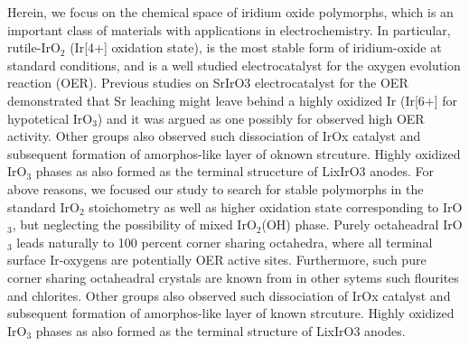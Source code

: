 




Herein, we focus on the chemical space of iridium oxide polymorphs,
which is an important class of materials with applications in electrochemistry. In particular, rutile-IrO$_2$ (Ir[4+] oxidation state), is the most stable form of iridium-oxide at standard conditions, and is a well studied electrocatalyst for the oxygen evolution reaction (OER).\cite{like 5 papers here pls}
Previous studies on SrIrO3 electrocatalyst for the OER demonstrated that Sr leaching might leave behind a highly oxidized Ir (Ir[6+] for hypotetical IrO$_3$) and it was argued as one possibly for observed high OER activity.\cite{Dickens} Other groups also observed such dissociation of IrOx catalyst and subsequent formation of amorphos-like layer of oknown strcuture\cite{Schlogl, beta-IrO3 OER paper}. Highly oxidized IrO$_3$ phases as also formed as the terminal struccture of LixIrO3 anodes.\cite{betaIrO3}
For above reasons, we focused our study to search for stable polymorphs in the standard IrO$_2$ stoichometry as well as higher oxidation state corresponding to IrO$_3$, but neglecting the possibility of mixed IrO$_2$(OH) phase.
Purely octaheadral IrO$_3$ leads naturally  to 100 percent corner sharing octahedra, where all terminal surface Ir-oxygens are potentially OER active sites. Furthermore, such pure corner sharing octaheadral crystals are known from in other sytems such flourites and chlorites. 
Other groups also observed such dissociation of IrOx catalyst and subsequent formation of amorphos-like layer of known strcuture.
\cite{Pearce2017}
%
Highly oxidized IrO$_3$ phases as also formed as the terminal structure of LixIrO3 anodes.\cite{Pearce2017}

